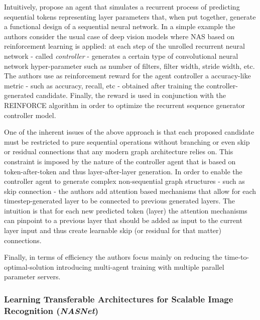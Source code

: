 \documentclass[conference]{IEEEtran}
\begin{document}
Intuitively, \cite{Zoph2017} propose an agent that simulates a recurrent process of predicting sequential tokens representing layer parameters that, when put together, generate a functional design of a sequential neural network. In a simple example the authors consider the usual case of deep vision models where NAS based on reinforcement learning is applied: at each step of the unrolled recurrent neural network - called \textit{controller} - generates a certain type of convolutional neural network hyper-parameter such as number of filters, filter width, stride width, etc. The authors use as reinforcement reward for the agent controller a accuracy-like metric - such as accuracy, recall, etc - obtained after training the controller-generated candidate. Finally, the reward is used in conjunction with the REINFORCE algorithm in order to optimize the recurrent sequence generator controller model. 

One of the inherent issues of the above approach is that each proposed candidate must be restricted to pure sequential operations without branching or even skip or residual connections that any modern graph architecture relies on. This constraint is imposed by the nature of the controller agent that is based on token-after-token and thus layer-after-layer generation. In order to enable the controller agent to generate complex non-sequential graph structures - such as skip connection - the authors add attention based mechanisms that allow for each timestep-generated layer to be connected to previous generated layers. The intuition is that for each new predicted token (layer) the attention mechanisms can pinpoint to a previous layer that should be added as input to the current layer input and thus create learnable skip (or residual for that matter) connections.

Finally, in terms of efficiency the authors focus mainly on reducing the time-to-optimal-solution introducing multi-agent training with multiple parallel parameter servers.\\


\subsubsection{Learning Transferable Architectures for Scalable Image Recognition (\textit{NASNet})}
\label{summary:nasnet}
\end{document}

